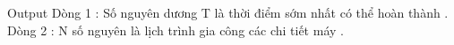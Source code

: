 Output
Dòng 1 : Số nguyên dương T là thời điểm sớm nhất có thể hoàn thành .   
\\   Dòng 2 : N số nguyên là lịch trình gia công các chi tiết máy .
